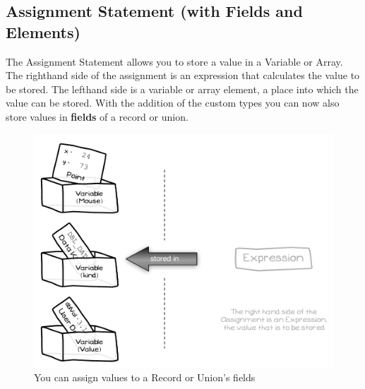 \clearpage
\subsection{Assignment Statement (with Fields and Elements)} %
\label{sub:assignment_statement_with_fields_and_elements_}

The Assignment Statement allows you to store a value in a Variable or Array. The righthand side of the assignment is an expression that calculates the value to be stored. The lefthand side is a variable or array element, a place into which the value can be stored. With the addition of the custom types you can now also store values in \textbf{fields} of a record or union.

\begin{figure}[h]
   \centering
   \includegraphics[width=\textwidth]{./topics/type-decl/diagrams/Assignment} 
   \caption{You can assign values to a Record or Union's fields}
   \label{fig:type-decl-assignment}
\end{figure}



